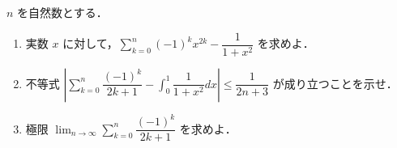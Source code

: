 \documentclass[../../main.tex]{subfiles}
\begin{document}
$n$ を自然数とする．

\begin{enumerate}
  \item
    実数 $x$ に対して，$\displaystyle \sum_{k=0}^{n} (-1)^k x^{2k} - \dfrac{1}{1+x^2}$ を求めよ．

  \item
    不等式 $\displaystyle \left| \sum_{k=0}^{n} \dfrac{(-1)^k}{2k+1} - \int_0^1 \dfrac{1}{1+x^2} dx \right| \leq \dfrac{1}{2n+3}$ が成り立つことを示せ．

  \item
    極限 $\displaystyle \lim_{n \to \infty} \sum_{k=0}^{n} \dfrac{(-1)^k}{2k+1}$ を求めよ．
\end{enumerate}
\end{document}
